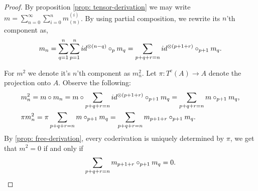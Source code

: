 \documentclass[../thesis.tex]{subfiles}
\begin{document}
        \begin{proof}
            By proposition \ref{prop: tensor-derivation} we may write $m = \sum_{n = 0}^\infty \sum_{i = 0}^n m_{(n)}^{(i)}$. By using partial composition, we rewrite its $n$'th component as,
            \begin{align*}
                m_n = \sum_{q=1}^n\sum_{p = 1}^n id^{\otimes (n-q)}\circ_{p} m_q = \sum_{p + q + r = n}id^{\otimes (p+1+r)}\circ_{p+1}m_q\tt{.}
            \end{align*}

            For $m^2$ we denote it's $n$'th component as $m^2_n$. Let $\pi : T^c(A) \rightarrow A$ denote the projection onto $A$. Observe the following:
            \begin{align*}
                & m^2_n = m\circ m_n = m\circ \sum_{p + q + r = n}id^{\otimes (p+1+r)}\circ_{p+1}m_q = \sum_{p + q + r = n}m\circ_{p+1}m_q\tt{,} \\
                & \pi m^2_n = \pi \sum_{p + q + r = n}m\circ_{p+1}m_q = \sum_{p + q + r = n}m_{p+1+r}\circ_{p+1}m_q\tt{.}
            \end{align*}
            By \ref{prop: free-derivation}, every coderivation is uniquely determined by $\pi$, we get that $m^2 = 0$ if and only if
            \begin{align*}
                \sum_{p+q+r = n}m_{p+1+r}\circ_{p+1}m_q = 0\tt{.}
            \end{align*}
        \end{proof}
\end{document}
